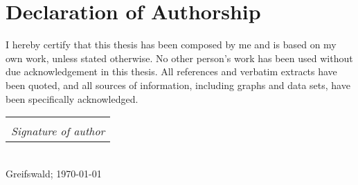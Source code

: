 \documentclass[
	12pt,
	twoside,
	chapterinoneline,
	onehalfspacing, %
	nolistspacing, %
	parskip, %
	headsepline, %
	english,
]{MastersDoctoralThesis} %
\makeatletter
\newcommand{\sign}[1]{%
  \begin{tabular}[t]{@{}c@{}}
  \makebox[1.5in]{\dotfill}\\
  \strut\emph{#1}\strut%
  \end{tabular}%
}
\makeatother
\begin{document}
	\chapter*{Declaration of Authorship}
%
		I hereby certify that this thesis has been composed by me and is based on 
		my own work, unless stated otherwise.	No other person’s work has been used
		without due acknowledgement in this thesis.
		All references and verbatim extracts have been quoted, and all sources of
		information, including graphs and data sets, have been specifically
		acknowledged.\\[2.0cm]
%
		\begin{flushright}
			\sign{Signature of author}\\
			Greifswald; \today
		\end{flushright}
%
%
	\tableofcontents %
%
	
	\mainmatter%
	\pagestyle{thesis}
% 
	
%
	
	
	
	
	
	
	
	
	
	
	
	
	
%	
	\appendix %
\end{document}
